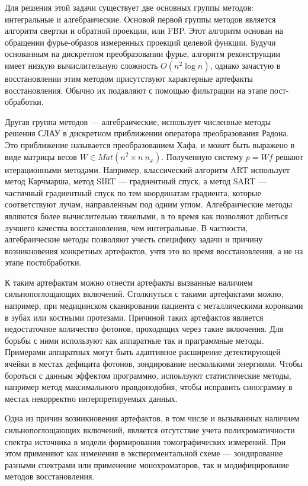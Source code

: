Для решения этой задачи существует две основных группы методов: интегральные и алгебраические.
Основой первой группы методов является алгоритм свертки и обратной проекции, или FBP. 
Этот алгоритм основан на обращении фурье-образов измеренных проекций целевой функции.
Будучи основанным на дискретном преобразовании фурье, алгоритм реконструкции имеет низкую вычислительную сложность $O(n^2 \log n)$, однако зачастую в восстановлении этим методом присутствуют характерные артефакты восстановления.
Обычно их подавляют с помощью фильтрации на этапе пост-обработки.

Другая группа методов --- алгебраические, использует численные методы решения СЛАУ в дискретном приближении оператора преобразования Радона.
Это приближение называется преобразованием Хафа, и может быть выражено в виде матрицы весов $W \in Mat\left(n^2 \times n ~ n_\varphi\right)$.
Полученную систему $p = Wf$ решают итерационными методами.
Например, классический алгоритм ART использует метод Карчмарша, метод SIRT --- градиентный спуск, а метод SART --- частичный градиентный спуск по тем координатам градиента, которые соответствуют лучам, направленным под одним углом.
Алгебраические методы являются более вычислительно тяжелыми, в то время как позволяют добиться лучшего качества восстановления, чем интегральные.
В частности, алгебраические методы позволяют учесть специфику задачи и причину возникновения конкретных артефактов, учтя это во время восстановления, а не на этапе постобработки.

К таким артефактам можно отнести артефакты вызванные наличием сильнопоглощающих включений.
Столкнуться с такими артефактами можно, например, при медицинском сканировании пациента с металлическими коронками в зубах или костными протезами.
Причиной таких артефактов является недостаточное количество фотонов, проходящих через такие включения.
Для борьбы с ними используют как аппаратные так и праграммные методы.
Примерами аппаратных могут быть адаптивное расширение детектирующей ячейки в местах дефицита фотонов, зондирование несколькими энергиями.
Чтобы бороться с данным эффектом программно, испоьлзуют статистические методы, например метод максимального правдоподобия, чтобы исправить синограмму в местах некорректно интерпретируемых данных.

Одна из причин возникновения артефактов, в том числе и вызыванных наличием сильнопоглощающих включений, является отсутствие учета полихроматичности спектра источника в модели формирования томографических измерений.
При этом применяют как изменения в экспериментальной схеме --- зондирование разными спектрами или применение монохроматоров, так и модифицирование методов восстановления.


